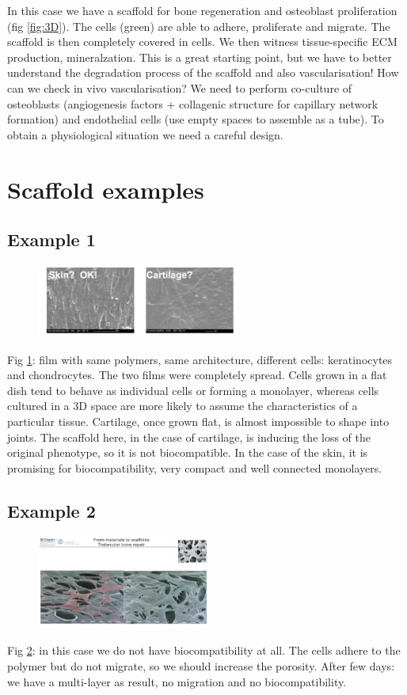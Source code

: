 In this case we have a scaffold for bone regeneration and osteoblast proliferation (fig \ref{fig:3D}).  The cells (green) are able to adhere, proliferate and migrate. The scaffold is then completely covered in cells. We then witness tissue-specific ECM production, mineralzation. This is a great starting point, but we have to better understand the degradation process of the scaffold and also vascularisation!
How can we check in vivo vascularisation? We need to perform co-culture of osteoblasts (angiogenesis factors + collagenic structure for capillary network formation) and endothelial cells (use empty spaces to assemble as a tube). To obtain a physiological situation we need a careful design.

\section{Scaffold examples}
\subsection{Example 1}
\begin{figure}[h]
\centering
\includegraphics[width=0.6\textwidth]{sk_car.jpg}
\caption{\label{fig:sk_car}}
\end{figure}
Fig \ref{fig:sk_car}: film with same polymers, same architecture, different cells: keratinocytes and chondrocytes. The two films were completely spread.
Cells grown in a flat dish tend to behave as individual cells or forming a monolayer, whereas cells cultured in a 3D space are more likely to assume the characteristics of a particular tissue.
Cartilage, once grown flat, is almost impossible to shape into joints. The scaffold here, in the case of cartilage, is inducing the loss of the original phenotype,  so it is not biocompatible.
In the case of the skin, it is promising for biocompatibility, very compact and well connected monolayers.

\subsection{Example 2}
\begin{figure}[h]
\centering
\includegraphics[width=0.5\textwidth]{bone.jpg}
\caption{\label{fig:bone}}
\end{figure}
Fig \ref{fig:bone}: in this case we do not have biocompatibility at all. The cells adhere to the polymer but do not migrate, so we should increase the porosity.
After few days: we have a multi-layer as result, no migration and no biocompatibility.

